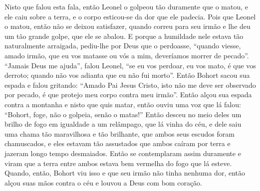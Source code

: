 Nisto que falou esta fala, então Leonel o golpeou tão duramente que o matou, e
ele caiu sobre a terra, e o corpo esticou-se da dor que ele padecia. Pois que
Leonel o matou, então não se deixou satisfazer, quando correu para seu irmão e
lhe deu um tão grande golpe, que ele se abalou. E porque a humildade nele
estava tão naturalmente arraigada, pediu-lhe por Deus que o perdoasse, “quando
viesse, amado irmão, que eu vos matasse ou vós a mim, deveríamos morrer de
pecado”. “Jamais Deus me ajuda”, falou Leonel, “se eu vos perdoar, eu vos mato,
é que vos derroto; quando não vos adianta que eu não fui morto”. Então Bohort
sacou sua espada e falou gritando: “Amado Pai Jesus Cristo, isto não me deve
ser observado por pecado, é que protejo meu corpo contra meu irmão”. Então
alçou sua espada contra a montanha e nisto que quis matar, então ouviu uma voz
que lá falou: “Bohort, foge, não o golpeia, senão o matas!” Então desceu no
meio deles um brilho de fogo em igualdade a um relâmpago, que lá vinha do céu,
e dele saiu uma chama tão maravilhosa e tão brilhante, que ambos seus escudos
foram chamuscados, e eles estavam tão assustados que ambos caíram por terra e
jazeram longo tempo desmaiados. Então se contemplaram assim
duramente e viram que a terra entre ambos estava bem vermelha do fogo que lá
esteve. Quando, então, Bohort viu isso e que seu irmão não tinha nenhuma dor,
então alçou suas mãos contra o céu e louvou a Deus com bom coração. 

